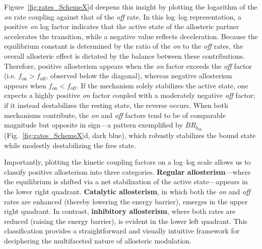 \documentclass[pdflatex,sn-nature]{sn-jnl}%
\theoremstyle{thmstyleone}%
\theoremstyle{thmstyletwo}%
\theoremstyle{thmstylethree}%
\begin{document}
Figure~\ref{fig:rates_SchemeX}d deepens this insight by plotting the logarithm of the \textit{on} rate coupling against that of the \textit{off} rate. In this log–log representation, a positive \textit{on} log factor indicates that the active state of the allosteric partner accelerates the transition, while a negative value reflects deceleration. Because the equilibrium constant is determined by the ratio of the \textit{on} to the \textit{off} rates, the overall allosteric effect is dictated by the balance between these contributions. Therefore, positive allosterism appears when the \textit{on} factor exceeds the \textit{off} factor (i.e. $f_{\text{on}} > f_{\text{off}}$, observed below the diagonal), whereas negative allosterism appears when $f_{\text{on}} < f_{\text{off}}$. If the mechanism solely stabilizes the active state, one expects a highly positive \textit{on} factor coupled with a moderately negative \textit{off} factor; if it instead destabilizes the resting state, the reverse occurs. When both mechanisms contribute, the \textit{on} and \textit{off} factors tend to be of comparable magnitude but opposite in sign—a pattern exemplified by $BR_{b_{\text{on}}}$ (Fig.~\ref{fig:rates_SchemeX}d, dark blue), which robustly stabilizes the bound state while modestly destabilizing the free state.

Importantly, plotting the kinetic coupling factors on a log–log scale allows us to classify positive allosterism into three categories. \textbf{Regular allosterism}—where the equilibrium is shifted via a net stabilization of the active state—appears in the lower right quadrant. \textbf{Catalytic allosterism}, in which both the \textit{on} and \textit{off} rates are enhanced (thereby lowering the energy barrier), emerges in the upper right quadrant. In contrast, \textbf{inhibitory allosterism}, where both rates are reduced (raising the energy barrier), is evident in the lower left quadrant. This classification provides a straightforward and visually intuitive framework for deciphering the multifaceted nature of allosteric modulation.
\end{document}
